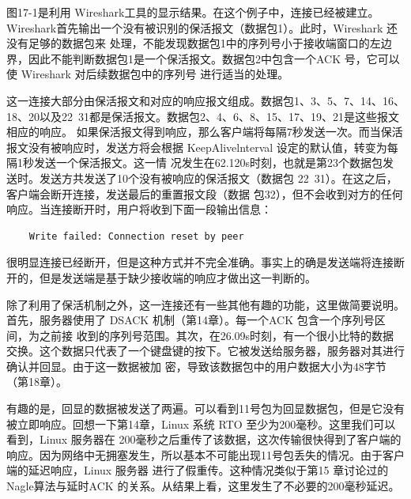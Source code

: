 图17-1是利用 Wireshark工具的显示结果。在这个例子中，连接已经被建立。Wireshark首先输出一个没有被识别的保活报文（数据包1）。此时，Wireshark 还没有足够的数据包来
处理，不能发现数据包1中的序列号小于接收端窗口的左边界，因此不能判断数据包1是一个保活报文。数据包2中包含一个ACK 号，它可以使 Wireshark 对后续数据包中的序列号
进行适当的处理。

这一连接大部分由保活报文和对应的响应报文组成。数据包1、3、5、7、14、16、18、20以及22~31都是保活报文。数据包2、4、6、8、15、17、19、21是这些报文相应的响应。
如果保活报文得到响应，那么客户端将每隔7秒发送一次。而当保活报文没有被响应时，发送方将会根据 KeepAlivelnterval 设定的默认值，转变为每隔1秒发送一个保活报文。这一情
况发生在62.120s时刻，也就是第23个数据包发送时。发送方共发送了10个没有被响应的保活报文（数据包 22~31）。在这之后，客户端会断开连接，发送最后的重置报文段（数据
包32），但不会收到对方的任何响应。当连接断开时，用户将收到下面一段输出信息：
\begin{verbatim}
    Write failed: Connection reset by peer
\end{verbatim}
很明显连接已经断开，但是这种方式并不完全准确。事实上的确是发送端将连接断开的，但是发送端是基于缺少接收端的响应才做出这一判断的。

除了利用了保活机制之外，这一连接还有一些其他有趣的功能，这里做简要说明。首先，服务器使用了 DSACK 机制（第14章）。每一个ACK 包含一个序列号区间，为之前接
收到的序列号范围。其次，在26.09s时刻，有一个很小比特的数据交换。这个数据只代表了一个键盘键的按下。它被发送给服务器，服务器对其进行确认并回显。由于这一数据被加
密，导致该数据包中的用户数据大小为48字节（第18章）。

有趣的是，回显的数据被发送了两遍。可以看到11号包为回显数据包，但是它没有被立即响应。回想一下第14章，Linux 系统 RTO 至少为200毫秒。这里我们可以看到，Linux
服务器在 200毫秒之后重传了该数据，这次传输很快得到了客户端的响应。因为网络中无拥塞发生，所以基本不可能出现11号包丢失的情况。由于客户端的延迟响应，Linux 服务器
进行了假重传。这种情况类似于第15 章讨论过的Nagle算法与延时ACK 的关系。从结果上看，这里发生了不必要的200毫秒延迟。

